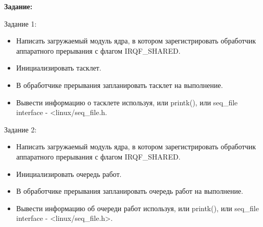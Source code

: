 \Introduction


\textbf{Задание:}

Задание 1:
\begin{itemize}
\item Написать загружаемый модуль ядра, в котором зарегистрировать обработчик аппаратного прерывания с флагом IRQF\_SHARED.
\item Инициализировать тасклет.
\item В обработчике прерывания запланировать тасклет на выполнение.
\item Вывести информацию о тасклете используя, или printk(), или seq\_file interface - <linux/seq\_file.h.
\end{itemize}
Задание 2:
\begin{itemize}
\item  Написать загружаемый модуль ядра, в котором зарегистрировать обработчик
аппаратного прерывания с флагом IRQF\_SHARED.
\item  Инициализировать очередь работ.
\item  В обработчике прерывания запланировать очередь работ на выполнение.
\item  Вывести информацию об очереди работ используя, или printk(), или seq\_file interface - <linux/seq\_file.h>.
\end{itemize}
